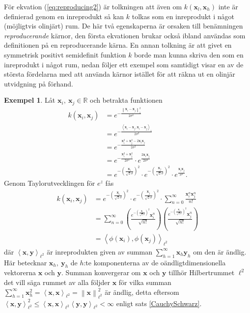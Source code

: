 \documentclass[a4paper, 12pt]{report}
\theoremstyle{definition}
\newtheorem{ex}{Exempel}[section]
\theoremstyle{remark}
\newcommand{\bfx}{\mathbf{x}}
\newcommand{\bfy}{\mathbf{y}}
\newcommand{\llangle}{\left\langle}
\newcommand{\rrangle}{\right\rangle}
\newcommand{\inner}[2]{\llangle #1, #2 \rrangle}
\begin{document}
För ekvation (\ref{eq:reproducing2}) är tolkningen att även om $k\left(\bfx_l, \bfx_h\right)$ inte är definierad genom en inreprodukt så kan $k$ tolkas som en inreprodukt i något (möjligtvis olinjärt) rum. De här två egenskaperna är orsaken till benämningen \emph{reproducerande} kärnor, den första ekvationen brukar också ibland användas som definitionen på en reproducerande kärna. En annan tolkning är att givet en symmetrisk positivt semidefinit funktion $k$ borde man kunna skriva den som en inreprodukt i något rum, nedan följer ett exempel som samtidigt visar en av de största fördelarna med att använda kärnor istället för att räkna ut en olinjär utvidgning på förhand.

\begin{ex}
	Låt $\bfx_i,~\bfx_j\in\mathbb{R}$ och betrakta funktionen
	\begin{align*}
		k\left(\bfx_i, \bfx_j\right)&=e^{-\frac{\left\| \bfx_i-\bfx_j\right\|_1^2}{2\sigma^2}}\\&=e^{-\frac{\inner{\bfx_i-\bfx_j}{\bfx_i-\bfx_j}_1}{2\sigma^2}}\\
		&=e^{-\frac{\bfx_i^2+\bfx_j^2-2\bfx_i\bfx_j}{2\sigma^2}}\\&=e^{-\frac{\bfx_i^2+\bfx_j^2}{2\sigma^2}}\cdot e^{\frac{2\bfx_i\bfx_j}{2\sigma^2}}\\
		&= e^{-\left(\frac{\bfx_i}{\sqrt{2}\sigma}\right)^2}\cdot e^{-\left(\frac{\bfx_j}{\sqrt{2}\sigma}\right)^2}\cdot e^{\frac{\bfx_i\bfx_j}{\sigma^2}}.
	\end{align*}
	Genom Taylorutvecklingen för $e^{z}$ fås
	\begin{align*}
		k\left(\bfx_i, \bfx_j\right)&= e^{-\left(\frac{\bfx_i}{\sqrt{2}\sigma}\right)^2}\cdot e^{-\left(\frac{\bfx_j}{\sqrt{2}\sigma}\right)^2}\cdot \sum_{n=0}^{\infty}\frac{\bfx_i^n\bfx_j^n}{n!}\\
		&= \sum_{n=0}^{\infty} \left(\frac{e^{-\left(\frac{\bfx_i}{\sqrt{2}\sigma}\right)^2} \bfx_i^n}{\sqrt{n!}}\right)\left(\frac{e^{-\left(\frac{\bfx_j}{\sqrt{2}\sigma}\right)^2} \bfx_j^n}{\sqrt{n!}}\right)\\
		&= \inner{\phi\left(\bfx_i\right)}{\phi\left(\bfx_j\right)}_{\ell^2}
	\end{align*}
	där $\inner{\bfx}{\bfy}_{\ell^2}$ är inreprodukten given av summan $\sum_{h=1}^{\infty}\bfx_h\bfy_h$ om den är ändlig. Här betecknar $\bfx_h,~\bfy_h$ de $h$:te komponenterna av de oändligtdimensionella vektorerna $\bfx$ och $\bfy$. Summan konvergerar om $\bfx$ och $\bfy$ tillhör Hilbertrummet $\ell^2$ det vill säga rummet av alla följder $\bfx$ för vilka summan $\sum_{h=1}^{\infty}\bfx_h^2=\inner{\bfx}{\bfx}_{\ell^2}=\left\|\bfx\right\|_{\ell^2}^2$ är ändlig, detta eftersom $\inner{\bfx}{\bfy}_{\ell^2}^2\leq\inner{\bfx}{\bfx}_{\ell^2}\inner{\bfy}{\bfy}_{\ell^2}<\infty$ enligt sats \ref{CauchySchwarz}.
	

\end{ex}
\end{document}
